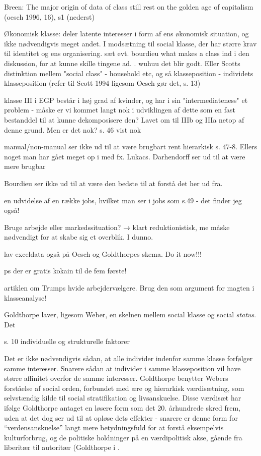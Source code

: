 Breen: The major origin of data of class still rest on the golden age of capitalism  (oesch 1996, 16), s1 (nederst)

Økonomisk klasse: deler latente interesser i form af ens økonomisk situation, og ikke nødvendigvis meget andet. I modsætning til social klasse, der har større krav til identitet og ens organisering.  sæt evt. bourdieu what makes a class ind i den diskussion, for at kunne skille tingene ad. . wuhuu det blir godt. Eller Scotts distinktion mellem "social class" - household etc, og så klasseposition - individets klasseposition (refer til Scott 1994 ligesom Oesch gør det, s. 13)





klasse III i EGP består i høj grad af kvinder, og har i sin "intermediateness" et problem - måske er vi kommet langt nok i udviklingen af dette som en fast bestanddel til at kunne dekomposisere den? Lavet om til IIIb og IIIa netop af denne grund. Men er det nok? s. 46 vist nok

manual/non-manual ser ikke ud til at være brugbart rent hierarkisk s. 47-8. Ellers noget man har gået meget op i med fx. Lukacs. Darhendorff ser ud til at være mere brugbar

Bourdieu ser ikke ud til at være den bedste til at forstå det her ud fra. 

en udvidelse af en række jobs, hvilket man ser i jobs som s.49 - det finder jeg også!




Bruge arbejde eller markedssituation?
	→ klart reduktionistisk, me måske nødvendigt for at skabe sig et overblik. I dunno.

lav exceldata også på Oesch og Goldthorpes skema. Do it now!!! 




ps der er gratis kokain til de fem første!





artiklen om Trumps hvide arbejdervælgere. Brug den som argument for magten i klasseanalyse!


Goldthorpe laver, ligesom Weber, en skelnen mellem social klasse og social \emph{status}. Det 



s. 10 individuelle og strukturelle faktorer 



Det er ikke nødvendigvis sådan, at alle individer indenfor samme klasse forfølger samme interesser. Snarere sådan at individer i samme klasseposition vil have større affinitet overfor de samme interesser. Goldthorpe benytter Webers forståelse af social orden, forbundet med ære og hierarkisk værdisætning, som selvstændig kilde til social stratifikation og livsanskuelse. Disse værdisæt har ifølge Goldthorpe antaget en løsere form som det 20. århundrede skred frem, uden at det dog ser ud til at opløse dets effekter - snarere er denne form for “verdensanskuelse” langt mere betydningsfuld for at forstå eksempelvis kulturforbrug, og de politiske holdninger på en værdipolitisk akse, gående fra liberitær til autoritær (Goldthorpe i \parencite[95]{Harrits2014}. 

